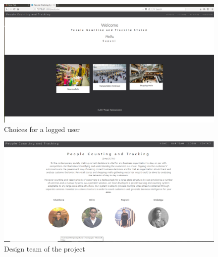 \documentclass[12pt,a4paper]{report}
\begin{document}
\begin{figure}[H]
  \centering
  \includegraphics[width=.8\linewidth]{login}
  \caption{Choices for a logged user}
  \label{web:3}
\end{figure}
\begin{figure}[H]
  \centering
  \includegraphics[width=.8\linewidth]{Capture}
  \caption{Design team of the project}
  \label{web:4}
\end{figure}
\end{document}
